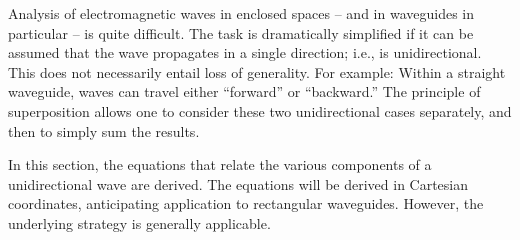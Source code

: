 

\label{m0222_General_Relationships_Unidirectional_Waves} %

Analysis of electromagnetic waves in enclosed spaces -- and in waveguides in particular -- is quite difficult.
The task is dramatically simplified if it can be assumed that the wave propagates in a single direction; i.e., is unidirectional.
This does not necessarily entail loss of generality.
For example: Within a straight waveguide, waves can travel either ``forward'' or ``backward.''
The principle of superposition 
allows one to consider these two unidirectional cases separately, and then to simply sum the results. 
 
In this section, the equations that relate the various components of a unidirectional wave are derived.
The equations will be derived in Cartesian coordinates, anticipating application to rectangular waveguides.
However, the underlying strategy is generally applicable.

